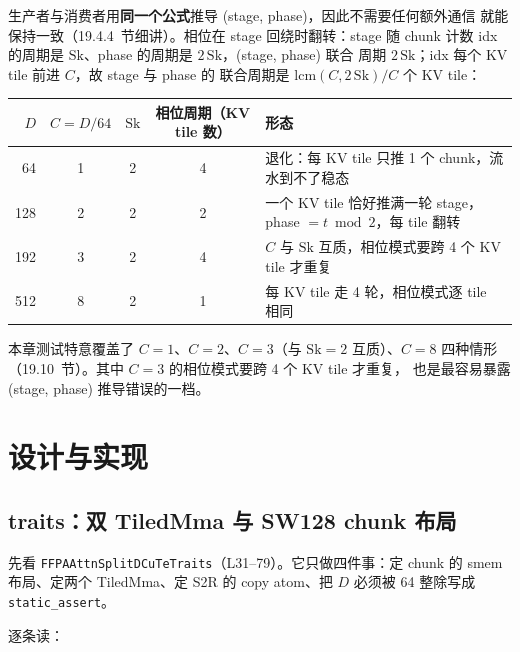 生产者与消费者用\textbf{同一个公式}推导 (stage, phase)，因此不需要任何额外通信
就能保持一致（19.4.4~节细讲）。相位在 stage 回绕时翻转：stage 随 chunk 计数
idx 的周期是 $\mathrm{Sk}$、phase 的周期是 $2\,\mathrm{Sk}$，(stage, phase) 联合
周期 $2\,\mathrm{Sk}$；idx 每个 KV tile 前进 $C$，故 stage 与 phase 的
联合周期是 $\mathrm{lcm}(C, 2\,\mathrm{Sk}) / C$ 个 KV tile：

\begin{center}
\begin{tabular}{rcccl}
\toprule
$D$ & $C = D/64$ & $\mathrm{Sk}$ & 相位周期（KV tile 数） & 形态 \\
\midrule
64 & 1 & 2 & 4 & 退化：每 KV tile 只推 1 个 chunk，流水到不了稳态 \\
128 & 2 & 2 & 2 & 一个 KV tile 恰好推满一轮 stage，phase $= t \bmod 2$，每 tile 翻转 \\
192 & 3 & 2 & 4 & $C$ 与 $\mathrm{Sk}$ 互质，相位模式要跨 4 个 KV tile 才重复 \\
512 & 8 & 2 & 1 & 每 KV tile 走 4 轮，相位模式逐 tile 相同 \\
\bottomrule
\end{tabular}
\end{center}

本章测试特意覆盖了 $C=1$、$C=2$、$C=3$（与 $\mathrm{Sk}{=}2$ 互质）、$C=8$
四种情形（19.10~节）。其中 $C=3$ 的相位模式要跨 4 个 KV tile 才重复，
也是最容易暴露 (stage, phase) 推导错误的一档。

\section{设计与实现}

\subsection{traits：双 TiledMma 与 SW128 chunk 布局}

先看 \texttt{FFPAAttn}\allowbreak\texttt{SplitDCuTe}\allowbreak\texttt{Traits}（L31--79）。它只做四件事：定 chunk 的 smem
布局、定两个 TiledMma、定 S2R 的 copy atom、把 $D$ 必须被 64 整除写成
\texttt{static\_\allowbreak{}assert}。



逐条读：

